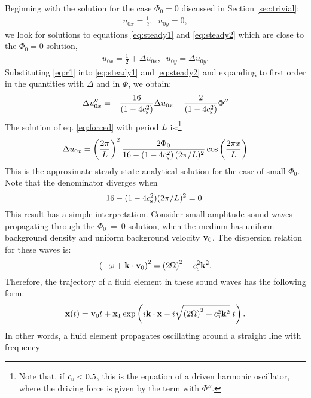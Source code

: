 \documentclass[useAMS,usenatbib]{mn2e}
\begin{document}
Beginning with the solution for the case $\Phi_0=0$ discussed in Section \ref{sec:trivial}:
\begin{align}
u_{0x} =\frac{1}{2},\;\; u_{0y} = 0,
\end{align}
we look for solutions to equations \eqref{eq:steady1} and \eqref{eq:steady2} which are close to the $\Phi_0=0$ solution, 
\begin{align}
u_{0x} =  \frac{1}{2} + \Delta u_{0x},\;\; u_{0y} = \Delta u_{0y}. \label{eq:r1}
\end{align}
Substituting \eqref{eq:r1} into \eqref{eq:steady1} and \eqref{eq:steady2} and expanding to first order in the quantities with $\Delta$ and in $\Phi$, we obtain:
\begin{equation}
\Delta u_{0x}'' = - \frac{16}{\left(1 - 4 c_{\rm s}^2 \right)} \Delta u_{0x} - \frac{2}{\left(1 - 4 c_{\rm s}^2 \right)}\Phi'' \label{eq:forced}
\end{equation}
%
The solution of eq. \eqref{eq:forced} with period $L$ is:\footnote{Note that, if $c_{\rm s}<0.5$, this is the equation of a driven harmonic oscillator, where the driving force is given by the term with $\Phi''$.}
\begin{equation} \label{eq:l2}
\Delta u_{0x} =  \left(\frac{2 \pi}{L}\right)^2 \frac{2 \Phi_0}{16 - \left(1 - 4 c_{\rm s}^2\right)(2 \pi / L)^2} \cos\left( \frac{2 \pi x}{L} \right)
\end{equation}
This is the approximate steady-state analytical solution for the case of small $\Phi_0$. Note that the denominator diverges when
\begin{equation}
16 - (1 - 4 c_{\rm s}^2) (2 \pi / L)^2  = 0. \label{eq:c1}
\end{equation} 
This result has a simple interpretation. Consider small amplitude sound waves propagating through the $\Phi_0~=~0$ solution, when the medium has uniform background density and uniform background velocity $\mathbf{v}_0$. The dispersion relation for these waves is:
\begin{equation}
\left(- \omega + \mathbf{k} \cdot \mathbf{v}_0 \right)^2 = \left( 2 \Omega \right)^2 + c_{\rm s}^2 \mathbf{k}^2. \label{eq:dr}
\end{equation}
Therefore, the trajectory of a fluid element in these sound waves has the following form:
\begin{equation}
\mathbf{x}(t) = \mathbf{v}_0 t + \mathbf{x}_1 \exp\left( i \mathbf{k} \cdot \mathbf{x} - i \sqrt{ \left( 2 \Omega \right)^2 + c_{\rm s}^2 \mathbf{k}^2} \; t\right).  \label{eq:traj}
\end{equation}
In other words, a fluid element propagates oscillating around a straight line with frequency
\end{document}

